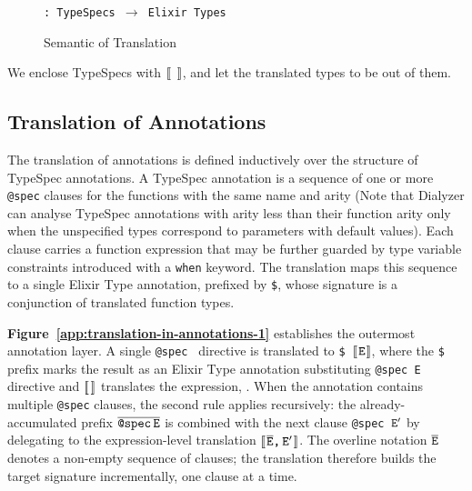\begin{figure} [H]
   \begin{grammarfig}
      \dsb{\,\,} \texttt{: TypeSpecs $\rightarrow$ Elixir Types}
   \end{grammarfig}
   \caption{Semantic of Translation}
   \label{app:semantic-of-translation}
\end{figure}

We enclose TypeSpecs with $[\![\hspace{.07em}\,\,\hspace{.07em}]\!]$, and let the translated types to be out of them.

\subsection{Translation of Annotations}

The translation of annotations is defined inductively over the structure of TypeSpec annotations.
A TypeSpec annotation is a sequence of one or more \texttt{@spec} clauses for the functions with the same name and arity
(Note that Dialyzer can analyse TypeSpec annotations with arity less than their function arity only when the unspecified types correspond to parameters with default values).
Each clause carries a function expression that may be further guarded by type variable constraints introduced with a \texttt{when} keyword.
The translation maps this sequence to a single Elixir Type annotation, prefixed by \texttt{\$}, whose signature is a conjunction of translated function types.

\textbf{Figure~\ref{app:translation-in-annotations-1}} establishes the outermost annotation layer.
A single \texttt{@spec \TSE} directive is translated to \texttt{\$\,$[\![\hspace{.07em}\texttt{E}\hspace{.07em}]\!]$}, where the \texttt{\$} prefix marks the result as an Elixir Type annotation substituting \texttt{@spec E} directive and $\dsb{}$ translates the expression, \TSE.
When the annotation contains multiple \texttt{@spec} clauses, the second rule applies recursively: the already-accumulated prefix $\overline{\texttt{@spec\,}\texttt{E}}$ is combined with the next clause \texttt{@spec\,$\texttt{E}^{\prime}$} by delegating to the expression-level translation $[\![\hspace{.07em}\overline{\texttt{E}}\texttt{,\,}\texttt{E}^{\prime}\hspace{.07em}]\!]$.
The overline notation $\overline{\texttt{E}}$ denotes a non-empty sequence of clauses; the translation therefore builds the target signature incrementally, one clause at a time.



